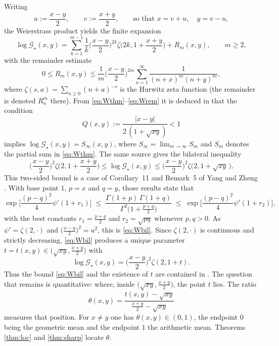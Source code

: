 \documentclass[11pt,a4paper]{amsart}
\theoremstyle{definition}
\newcommand{\Gs}{\mathcal{G}_{\star}}
\begin{document}
Writing
\begin{equation}\label{eq:uv}
  u:=\frac{x-y}{2},\qquad v:=\frac{x+y}{2},\qquad\text{so that }x=v+u,\quad y=v-u,
\end{equation}
the Weierstrass product yields the finite expansion
\begin{equation}\label{eq:Wthm}
  \log\Gs(x,y)=\sum_{k=1}^{m-1}\frac{1}{k}\Big(\frac{x-y}{2}\Big)^{2k}
     \zeta\Big(2k,1+\frac{x+y}{2}\Big)+R_{m}(x,y),\qquad m\ge2,
\end{equation}
with the remainder estimate
\begin{equation}\label{eq:Wrem}
  0\le R_{m}(x,y)\le
  \frac1m\Big(\frac{x-y}{2}\Big)^{2m}\sum_{n=1}^{\infty}\frac{1}{(n+x)^{m}(n+y)^{m}},
\end{equation}
where $\zeta(s,a)=\sum_{n\ge0}(n+a)^{-s}$ is the Hurwitz zeta function
\cite[Thm.~1]{Wisniewska25} (the remainder is denoted $R^{m}_{n}$ there). From
\eqref{eq:Wthm}--\eqref{eq:Wrem} it is deduced in \cite[Cor.~1]{Wisniewska25} that the
condition
\begin{equation}\label{eq:Q}
  Q(x,y):=\frac{|x-y|}{2\,(1+\sqrt{xy})}<1
\end{equation}
implies $\log\Gs(x,y)=S_{\infty}(x,y)$, where $S_\infty=\lim_{m\to\infty}S_m$ and $S_m$
denotes the partial sum in \eqref{eq:Wthm}. The same source gives the bilateral inequality
\begin{equation}\label{eq:Wbil}
  \Big(\frac{x-y}{2}\Big)^{2}\zeta\Big(2,1+\frac{x+y}{2}\Big)\le\log\Gs(x,y)
  \le\Big(\frac{x-y}{2}\Big)^{2}\zeta\big(2,1+\sqrt{xy}\,\big).
\end{equation}
This two-sided bound is a case of Corollary~11 and Remark~5 of Yang and Zheng
\cite{YangZheng19}. With base point $1$, $p=x$ and $q=y$, those results state that
\begin{equation}\label{eq:YZ}
  \exp\Big[\frac{(p-q)^{2}}{4}\psi'(1+r_{1})\Big]
  \;\le\;\frac{\Gamma(1+p)\,\Gamma(1+q)}{\Gamma^{2}\big(1+\frac{p+q}{2}\big)}
  \;\le\;\exp\Big[\frac{(p-q)^{2}}{4}\psi'(1+r_{2})\Big],
\end{equation}
with the best constants $r_{1}=\frac{p+q}{2}$ and $r_{2}=\sqrt{pq}$ whenever $p,q>0$. As
$\psi'=\zeta(2,\cdot)$ and $\big(\frac{x-y}{2}\big)^{2}=u^{2}$, this is
\eqref{eq:Wbil}. Since $\zeta(2,\cdot)$ is continuous and strictly decreasing,
\eqref{eq:Wbil} produces a unique parameter
$t=t(x,y)\in\big(\sqrt{xy},\tfrac{x+y}{2}\big)$ with
\begin{equation}\label{eq:Wt}
  \log\Gs(x,y)=\Big(\frac{x-y}{2}\Big)^{2}\zeta(2,1+t).
\end{equation}
Thus the bound \eqref{eq:Wbil} and the existence of $t$ are contained in
\cite{YangZheng19}. The question that remains is quantitative: where, inside
$\big(\sqrt{xy},\frac{x+y}{2}\big)$, the point $t$ lies. The ratio
\begin{equation}\label{eq:theta}
  \theta(x,y)
  =\frac{t(x,y)-\sqrt{xy}}{\frac{x+y}{2}-\sqrt{xy}}
\end{equation}
measures that position. For $x\ne y$ one has $\theta(x,y)\in(0,1)$, the endpoint $0$
being the geometric mean and the endpoint $1$ the arithmetic mean. Theorems
\ref{thm:loc} and \ref{thm:sharp} locate $\theta$.
\end{document}
